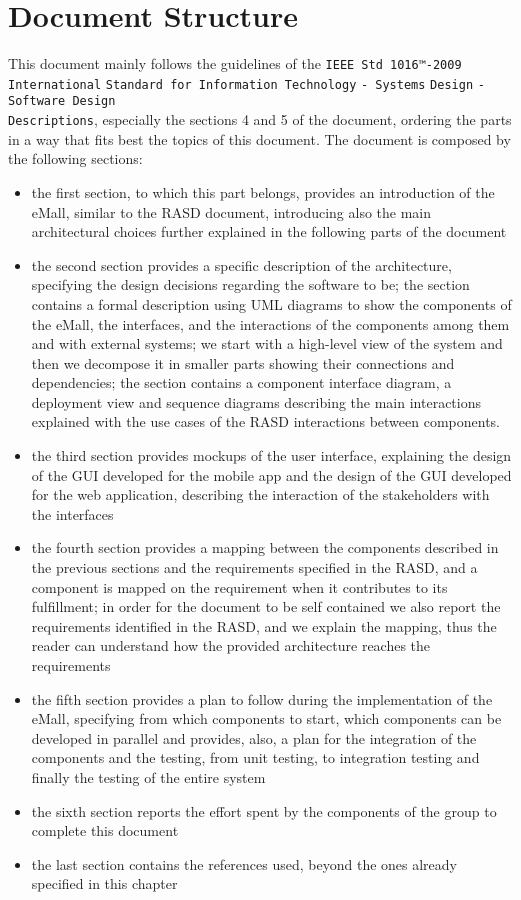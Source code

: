 \section{Document Structure}
\label{sec:Document Structure}%
This document mainly follows the guidelines of the \verb|IEEE Std 1016™-2009 International| \verb|Standard for Information Technology| \verb|- Systems| \verb|Design| \verb|- Software Design|\\ \verb|Descriptions|, especially the sections 4 and 5 of the document, ordering the parts in a way that fits best the topics of this document.
The document is composed by the following sections:
\begin{itemize}
    \item the first section, to which this part belongs, provides an introduction of the eMall, similar to the RASD document, introducing also the main architectural choices further explained in the following parts of the document
    \item the second section provides a specific description of the architecture, specifying the design decisions regarding the software to be; the section contains a formal description using UML diagrams to show the components of the eMall, the interfaces, and the interactions of the components among them and with external systems; we start with a high-level view of the system and then we decompose it in smaller parts showing their connections and dependencies; the section contains a component interface diagram, a deployment view and sequence diagrams describing the main interactions explained with the use cases of the RASD
interactions between components.
    \item the third section provides mockups of the user interface, explaining the design of the GUI developed for the mobile app and the design of the GUI developed for the web application, describing the interaction of the stakeholders with the interfaces
    \item the fourth section provides a mapping between the components described in the previous sections and the requirements specified in the RASD, and a component is mapped on the requirement when it contributes to its fulfillment; in order for the document to be self contained we also report the requirements identified in the RASD, and we explain the mapping, thus the reader can understand how the provided architecture reaches the requirements
    \item the fifth section provides a plan to follow during the implementation of the eMall, specifying from which components to start, which components can be developed in parallel and provides, also, a plan for the integration of the components and the testing, from unit testing, to integration testing and finally the testing of the entire system
    \item the sixth section reports the effort spent by the components of the group to complete this document
    \item the last section contains the references used, beyond the ones already specified in this chapter
\end{itemize}